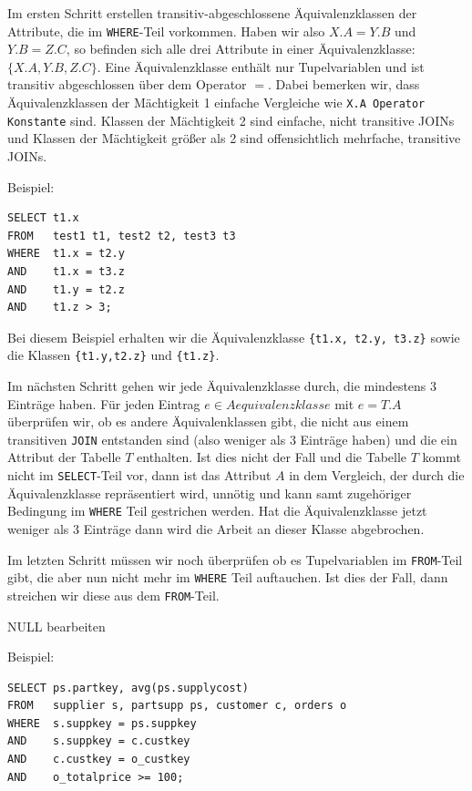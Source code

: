 Im ersten Schritt erstellen transitiv-abgeschlossene Äquivalenzklassen der Attribute, die im \verb|WHERE|-Teil vorkommen. Haben wir also $X.A=Y.B$ und $Y.B=Z.C$, so befinden sich alle drei Attribute in einer Äquivalenzklasse: $\{X.A,Y.B,Z.C\}$. Eine Äquivalenzklasse enthält nur Tupelvariablen und ist transitiv abgeschlossen über dem Operator $=$.
Dabei bemerken wir, dass Äquivalenzklassen der Mächtigkeit 1 einfache Vergleiche wie \verb|X.A Operator Konstante| sind. Klassen der Mächtigkeit 2 sind einfache, nicht transitive JOINs und Klassen der Mächtigkeit größer als 2 sind offensichtlich mehrfache, transitive JOINs.

Beispiel:
\begin{lstlisting}[mathescape]
SELECT t1.x 
FROM   test1 t1, test2 t2, test3 t3
WHERE  t1.x = t2.y
AND    t1.x = t3.z
AND    t1.y = t2.z
AND    t1.z > 3;
\end{lstlisting}

Bei diesem Beispiel erhalten wir die Äquivalenzklasse \verb|{t1.x, t2.y, t3.z}| sowie die Klassen \verb|{t1.y,t2.z}| und \verb|{t1.z}|.

Im nächsten Schritt gehen wir jede Äquivalenzklasse durch, die mindestens 3 Einträge haben. Für jeden Eintrag $e\in\mathit{Aequivalenzklasse}$ mit $e=T.A$ überprüfen wir, ob es andere Äquivalenklassen gibt, die nicht aus einem transitiven \verb|JOIN| entstanden sind (also weniger als 3 Einträge haben) und die ein Attribut der Tabelle $T$ enthalten. Ist dies nicht der Fall und die Tabelle $T$ kommt nicht im \verb|SELECT|-Teil vor, dann ist das Attribut $A$ in dem Vergleich, der durch die Äquivalenzklasse repräsentiert wird, unnötig und kann samt zugehöriger Bedingung im \verb|WHERE| Teil gestrichen werden. Hat die Äquivalenzklasse jetzt weniger als 3 Einträge dann wird die Arbeit an dieser Klasse abgebrochen.

Im letzten Schritt müssen wir noch überprüfen ob es Tupelvariablen im \verb|FROM|-Teil gibt, die aber nun nicht mehr im \verb|WHERE| Teil auftauchen. Ist dies der Fall, dann streichen wir diese aus dem \verb|FROM|-Teil.

NULL bearbeiten

Beispiel:
\begin{lstlisting}[mathescape]
SELECT ps.partkey, avg(ps.supplycost)
FROM   supplier s, partsupp ps, customer c, orders o
WHERE  s.suppkey = ps.suppkey 
AND    s.suppkey = c.custkey
AND    c.custkey = o_custkey
AND    o_totalprice >= 100;
\end{lstlisting}


